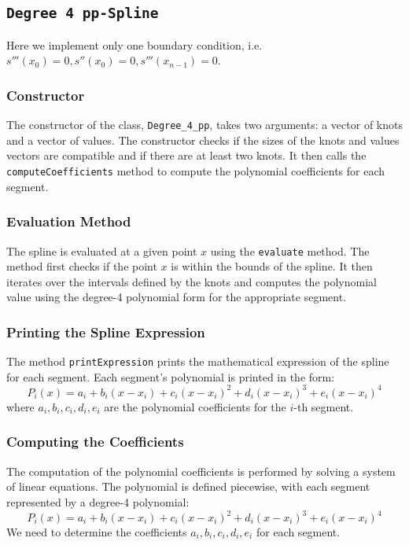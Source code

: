 \documentclass{article}
\begin{document}
\subsection{\texttt{Degree 4 pp-Spline}}
Here we implement only one boundary condition, i.e. \( s'''(x_0)=0, s''(x_0)=0, s'''(x_{n-1})=0 \).
\subsubsection{Constructor}
The constructor of the class, \texttt{Degree\_4\_pp}, takes two arguments: a vector of knots and a vector of values. The constructor checks if the sizes of the knots and values vectors are compatible and if there are at least two knots. It then calls the \texttt{computeCoefficients} method to compute the polynomial coefficients for each segment.


\subsubsection{Evaluation Method}
The spline is evaluated at a given point \( x \) using the \texttt{evaluate} method. The method first checks if the point \( x \) is within the bounds of the spline. It then iterates over the intervals defined by the knots and computes the polynomial value using the degree-4 polynomial form for the appropriate segment.


\subsubsection{Printing the Spline Expression}
The method \texttt{printExpression} prints the mathematical expression of the spline for each segment. Each segment's polynomial is printed in the form:
\[
P_i(x) = a_i + b_i(x - x_i) + c_i(x - x_i)^2 + d_i(x - x_i)^3 + e_i(x - x_i)^4
\]
where \( a_i, b_i, c_i, d_i, e_i \) are the polynomial coefficients for the \( i \)-th segment.

\subsubsection{Computing the Coefficients}

The computation of the polynomial coefficients is performed by solving a system of linear equations. The polynomial is defined piecewise, with each segment represented by a degree-4 polynomial:
\[
P_i(x) = a_i + b_i(x - x_i) + c_i(x - x_i)^2 + d_i(x - x_i)^3 + e_i(x - x_i)^4
\]
We need to determine the coefficients \( a_i, b_i, c_i, d_i, e_i \) for each segment.
\end{document}
